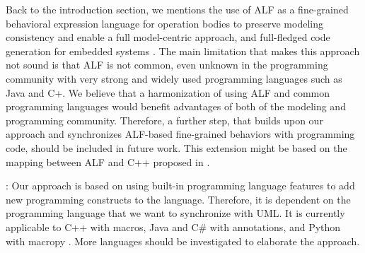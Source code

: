 \noindent
{}
Back to the introduction section, we mentions the use of ALF as a fine-grained behavioral expression language for operation bodies to preserve modeling consistency and enable a full model-centric approach, and full-fledged code generation for embedded systems \cite{ciccozzi2015generation}.
The main limitation that makes this approach not sound is that ALF is not common, even unknown in the programming community with very strong and widely used programming languages such as Java and C+. 
We believe that a harmonization of using ALF and common programming languages would benefit advantages of both of the modeling and programming community.
Therefore, a further step, that builds upon our approach and synchronizes ALF-based fine-grained behaviors with programming code, should be included in future work.
This extension might be based on the mapping between ALF and C++ proposed in \cite{Ciccozzi2016}. 

\noindent
{}:
Our approach is based on using built-in programming language features to add new programming constructs to the language.
Therefore, it is dependent on the programming language that we want to synchronize with UML. 
It is currently applicable to C++ with macros, Java and C\# with annotations, and Python with macropy \cite{macropy}.
More languages should be investigated to elaborate the approach.%

 



